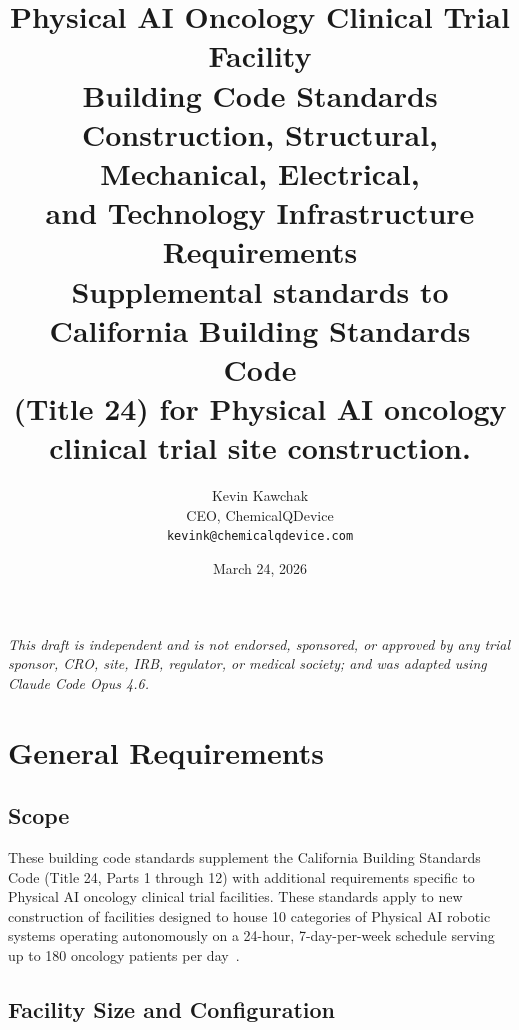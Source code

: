 \documentclass[11pt,letterpaper]{article}
\title{%
  \textbf{Physical AI Oncology Clinical Trial Facility}\\
  \textbf{Building Code Standards}\\[6pt]
  \large Construction, Structural, Mechanical, Electrical,\\
  and Technology Infrastructure Requirements\\[6pt]
  \normalsize Supplemental standards to California Building Standards Code\\
  (Title 24) for Physical AI oncology clinical trial site construction.
}
\author{%
  Kevin Kawchak\\
  CEO, ChemicalQDevice\\
  \texttt{kevink@chemicalqdevice.com}
}
\date{March 24, 2026}
\begin{document}
\maketitle
\thispagestyle{fancy}

\begin{center}
\footnotesize
\textit{This draft is independent and is not endorsed, sponsored, or approved
by any trial sponsor, CRO, site, IRB, regulator, or medical society;
and was adapted using Claude Code Opus 4.6.}
\end{center}

\vspace{1em}
\tableofcontents
\newpage

\section{General Requirements}

\subsection{Scope}

These building code standards supplement the California Building Standards Code
(Title 24, Parts 1 through 12) with additional requirements specific to Physical
AI oncology clinical trial facilities. These standards apply to new construction
of facilities designed to house 10 categories of Physical AI robotic systems
operating autonomously on a 24-hour, 7-day-per-week schedule serving up to 180
oncology patients per day~\cite{sitespec2026}.

\subsection{Facility Size and Configuration}
\end{document}
